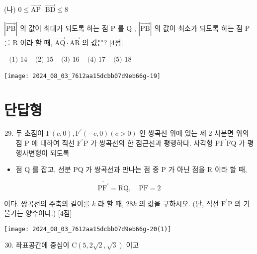\documentclass[10pt]{article}
\begin{document}
(나) \(0 \leq \overrightarrow{\mathrm{AP}} \cdot \overrightarrow{\mathrm{BD}} \leq 8\)

\(|\overrightarrow{\mathrm{PB}}|\) 의 값이 최대가 되도록 하는 점 P 를 Q , \(|\overrightarrow{\mathrm{PB}}|\) 의 값이 최소가 되도록 하는 점 P 를 R 이라 할 때, \(\overrightarrow{\mathrm{AQ}} \cdot \overrightarrow{\mathrm{AR}}\) 의 값은? [4점]

\(\begin{array}{lllll}\text { (1) } 14 & \text { (2) } 15 & \text { (3) } 16 & \text { (4) } 17 & \text { (5) } 18\end{array}\)

\begin{center}
\texttt{[image: 2024\_08\_03\_7612aa15dcbb07d9eb66g-19]}
\end{center}

\section*{단답형}
\begin{enumerate}
  \setcounter{enumi}{28}
  \item 두 초점이 \(\mathrm{F}(c, 0), \mathrm{F}^{\prime}(-c, 0)(c>0)\) 인 쌍곡선 위에 있는 제 2 사분면 위의 점 P 에 대하여 직선 \(\mathrm{F}^{\prime} \mathrm{P}\) 가 쌍곡선의 한 점근선과 평행하다. 사각형 \(\mathrm{PF}^{\prime} \mathrm{FQ}\) 가 평행사변형이 되도록
\end{enumerate}

\begin{itemize}
  \item 점 Q 를 잡고, 선분 PQ 가 쌍곡선과 만나는 점 중 P 가 아닌 점을 R 이라 할 때,
\end{itemize}

\[
\overline{\mathrm{PF}^{\prime}}=\overline{\mathrm{RQ}}, \quad \overline{\mathrm{PF}}=2
\]

이다. 쌍곡선의 주축의 길이를 \(k\) 라 할 때, \(28 k\) 의 값을 구하시오. (단, 직선 \(\mathrm{F}^{\prime} \mathrm{P}\) 의 기울기는 양수이다.) [4점]

\begin{center}
\texttt{[image: 2024\_08\_03\_7612aa15dcbb07d9eb66g-20(1)]}
\end{center}

\begin{enumerate}
  \setcounter{enumi}{29}
  \item 좌표공간에 중심이 \(\mathrm{C}(5,2 \sqrt{2}, \sqrt{3})\) 이고
\end{enumerate}
\end{document}
